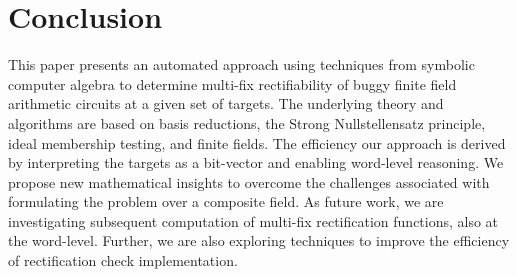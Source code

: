 \section{Conclusion}\label{sec:conc}
This paper presents an automated approach using techniques from 
symbolic computer algebra to determine multi-fix rectifiability of 
buggy finite field arithmetic circuits at a given set of targets. 
The underlying theory and algorithms are based on \Grobner 
basis reductions, the Strong Nullstellensatz principle, ideal membership testing,
and finite fields.
The efficiency our approach is derived by interpreting the targets 
as a bit-vector and enabling word-level reasoning.
We propose new mathematical insights to overcome the
challenges associated with formulating the problem over a composite field.
As future work, we are
investigating subsequent computation of multi-fix rectification 
functions, also at the word-level. Further, we are also exploring
techniques to improve the efficiency of rectification check implementation.


